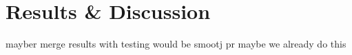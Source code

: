 \section{Results \& Discussion}

mayber merge results with testing would be smootj pr maybe we already do this 